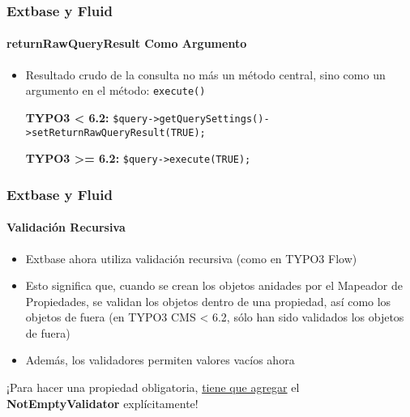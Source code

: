 
\begin{frame}[fragile]
	\frametitle{Extbase y Fluid}
	\framesubtitle{returnRawQueryResult Como Argumento}

	\lstset{
		basicstyle=\smaller\ttfamily
	}

	\begin{itemize}
		\item Resultado crudo de la consulta no más un método central,\newline
			sino como un argumento en el método: \texttt{execute()}
			\newline

			\smaller\textbf{TYPO3 < 6.2:}\normalsize\newline
			\lstinline!$query->getQuerySettings()->setReturnRawQueryResult(TRUE);!
			\newline

			\smaller\textbf{TYPO3 >= 6.2:}\normalsize\newline
			\lstinline!$query->execute(TRUE);!

	\end{itemize}

\end{frame}


\begin{frame}[fragile]
	\frametitle{Extbase y Fluid}
	\framesubtitle{Validación Recursiva}

	\begin{itemize}
		\item Extbase ahora utiliza validación recursiva (como en TYPO3 Flow)
		\item Esto significa que, cuando se crean los objetos anidades por el Mapeador de Propiedades,
			se validan los objetos dentro de una propiedad, así como los objetos de fuera\newline
			(en TYPO3 CMS < 6.2, sólo han sido validados los objetos de fuera)
		\item Además, los validadores permiten valores vacíos ahora
	\end{itemize}

	\breakingchange

	\smaller\begin{center} ¡Para hacer una propiedad obligatoria, \underline{tiene que agregar} el \textbf{NotEmptyValidator} explícitamente!\end{center}\normalsize

\end{frame}

